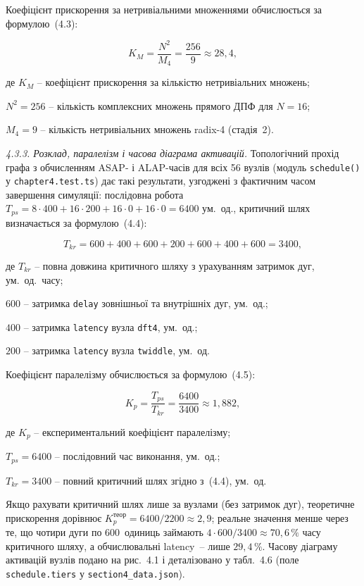 \documentclass[
]{article}
\begin{document}
Коефіцієнт прискорення за нетривіальними множеннями обчислюється за
формулою~(4.3):

\begin{equation}
\tag{4.3}\label{eq:KM}
K_{M} = \frac{N^{2}}{M_{4}} = \frac{256}{9} \approx 28{,}4,
\end{equation}

де \(K_{M}\) -- коефіцієнт прискорення за кількістю нетривіальних множень;

\(N^{2} = 256\) -- кількість комплексних множень прямого ДПФ для \(N = 16\);

\(M_{4} = 9\) -- кількість нетривіальних множень radix-4 (стадія~2).

\emph{4.3.3. Розклад, паралелізм і часова діаграма активацій.}
Топологічний прохід графа з обчисленням ASAP- і ALAP-часів для всіх 56
вузлів (модуль \texttt{schedule()} у \texttt{chapter4.test.ts}) дає такі
результати, узгоджені з фактичним часом завершення симуляції:
послідовна робота
\(T_{ps} = 8 \cdot 400 + 16 \cdot 200 + 16 \cdot 0 + 16 \cdot 0 = 6400\)
ум.~од., критичний шлях визначається за формулою~(4.4):

\begin{equation}
\tag{4.4}\label{eq:tkr-full}
T_{kr} = 600 + 400 + 600 + 200 + 600 + 400 + 600 = 3400,
\end{equation}

де \(T_{kr}\) -- повна довжина критичного шляху з урахуванням затримок дуг, ум.~од.~часу;

\(600\) -- затримка \texttt{delay} зовнішньої та внутрішніх дуг, ум.~од.;

\(400\) -- затримка \texttt{latency} вузла \texttt{dft4}, ум.~од.;

\(200\) -- затримка \texttt{latency} вузла \texttt{twiddle}, ум.~од.

Коефіцієнт паралелізму обчислюється за формулою~(4.5):

\begin{equation}
\tag{4.5}\label{eq:Kp-full}
K_{p} = \frac{T_{ps}}{T_{kr}} = \frac{6400}{3400} \approx 1{,}882,
\end{equation}

де \(K_{p}\) -- експериментальний коефіцієнт паралелізму;

\(T_{ps} = 6400\) -- послідовний час виконання, ум.~од.;

\(T_{kr} = 3400\) -- повний критичний шлях згідно з~(4.4), ум.~од.

Якщо рахувати критичний шлях лише за вузлами (без затримок дуг),
теоретичне прискорення дорівнює
\(K_{p}^{\text{теор}} = 6400/2200 \approx 2{,}9\); реальне значення
менше через те, що чотири дуги по 600~одиниць займають
\(4 \cdot 600/3400 \approx 70{,}6\,\%\) часу критичного шляху, а
обчислювальні latency~-- лише \(29{,}4\,\%\). Часову діаграму активацій
вузлів подано на рис.~4.1 і деталізовано у табл.~4.6 (поле
\texttt{schedule.tiers} у \texttt{section4\_data.json}).
\end{document}
